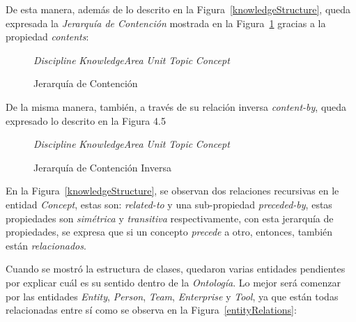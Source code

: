 \begin{itemize}
De esta manera, además de lo descrito en la Figura~\ref{knowledgeStructure}, queda expresada la \textit{Jerarquía de Contención} mostrada en la Figura~\ref{contentHierarchy} gracias a la propiedad \textit{contents}:


\begin{figure}[!h]
    \begin{center}
        \textit{Discipline} \subseteq \textit{KnowledgeArea} \subseteq \textit{Unit} \subseteq \textit{Topic} \subseteq \textit{Concept}
        \caption{Jerarquía de Contención}
        \label{contentHierarchy}
    \end{center}
\end{figure}

De la misma manera, también, a través de su relación inversa \textit{content-by}, queda expresado lo descrito en la Figura 4.5


\begin{figure}[!h]
    \begin{center}
        \textit{Discipline} \supseteq \textit{KnowledgeArea} \supseteq \textit{Unit} \supseteq \textit{Topic} \supseteq \textit{Concept}
        \caption{Jerarquía de Contención Inversa}
        \label{inverseContent}
    \end{center}
\end{figure}

En la Figura~\ref{knowledgeStructure}, se observan dos relaciones recursivas en le entidad \textit{Concept}, estas son: \textit{related-to} y una sub-propiedad \textit{preceded-by}, estas propiedades son \textit{simétrica} y \textit{transitiva} respectivamente, con esta jerarquía de propiedades, se expresa que si un concepto \textit{precede} a otro, entonces, también están \textit{relacionados}.

Cuando se mostró la estructura de clases, quedaron varias entidades pendientes por explicar cuál es su sentido dentro de la \textit{Ontología}. Lo mejor será comenzar por las entidades \textit{Entity}, \textit{Person}, \textit{Team}, \textit{Enterprise} y \textit{Tool}, ya que están todas relacionadas entre sí como se observa en la Figura~\ref{entityRelations}:


\end{itemize}
